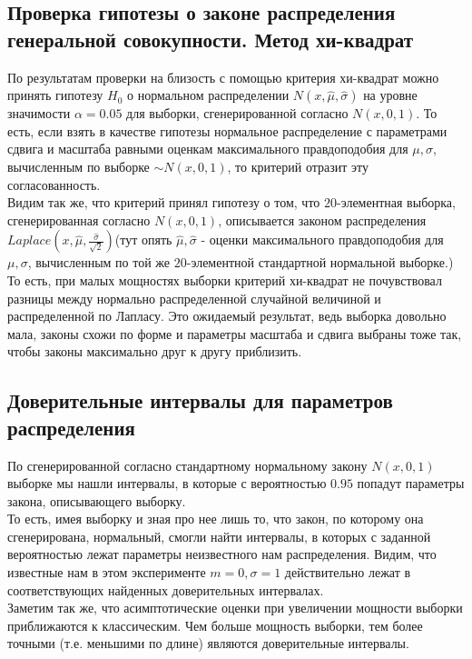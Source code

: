 \documentclass[../body.tex]{subfiles}
\begin{document}
	\subsection{Проверка гипотезы о законе распределения генеральной совокупности. Метод хи-квадрат}
	По результатам проверки на близость с помощью критерия хи-квадрат можно принять гипотезу $H_0$ о нормальном распределении $N(x, \hat{\mu}, \hat{\sigma})$ на уровне значимости $ \alpha = 0.05$ для выборки, сгенерированной согласно $N(x, 0, 1)$. То есть, если взять в качестве гипотезы нормальное распределение с параметрами сдвига и масштаба равными оценкам максимального правдоподобия для $\mu, \sigma$, вычисленным по выборке $\sim N(x, 0, 1)$, то критерий отразит эту согласованность.\\
	Видим так же, что критерий принял гипотезу о том, что $20$-элементная выборка, сгенерированная согласно $N(x, 0, 1)$, описывается законом распределения $Laplace(x, \hat{\mu},\frac{\hat{\sigma}}{\sqrt2} )$(тут опять $\hat{\mu}, \hat{\sigma}$ - оценки максимального правдоподобия для $\mu, \sigma$, вычисленным по той же $20$-элементной стандартной нормальной выборке.)\\То есть, при малых мощностях выборки критерий хи-квадрат не почувствовал разницы между нормально распределенной случайной величиной и распределенной по Лапласу. Это ожидаемый результат, ведь выборка довольно мала, законы схожи по форме и параметры масштаба и сдвига выбраны тоже так, чтобы законы максимально друг к другу приблизить. 
	
	\subsection{Доверительные интервалы для параметров распределения}
	По сгенерированной согласно стандартному нормальному закону $N(x, 0, 1)$ выборке мы нашли интервалы, в которые с вероятностью $0.95$ попадут параметры закона, описывающего выборку.\\ То есть, имея выборку и зная про нее лишь то, что закон, по которому она сгенерирована, нормальный, смогли найти интервалы, в которых с заданной вероятностью лежат параметры неизвестного нам распределения.
	Видим, что известные нам в этом эксперименте $m = 0, \sigma = 1$ действительно лежат в соответствующих найденных доверительных интервалах.\\
	Заметим так же, что асимптотические оценки при увеличении мощности выборки приближаются к классическим.
	Чем больше мощность выборки, тем более точными (т.е. меньшими по длине) являются доверительные интервалы.
\end{document}
